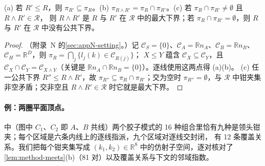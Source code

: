 \begin{lemma}[逐线交与钳夹集的交]\label{lem:method-meets}
(a) 若 $R'\le R$，则 $\pi_{R'}\subseteq\pi_R$。(b) $\pi_{R\wedge R'}=\pi_R\cap\pi_{R'}$。(c) 若 $\pi_R\cap\pi_{R'}\neq\emptyset$ 且 $R\wedge R'\in\mathcal R$，
则 $R\wedge R'$ 是 $R$ 与 $R'$ 在 $\mathcal R$ 中的最大下界；若 $\pi_R\cap\pi_{R'}=\emptyset$，则 $R$ 与 $R'$ 在 $\mathcal R$ 中没有公共下界。
\end{lemma}

\begin{proof}
（附录~N 的\cref{sec:appN-setting}。）记 $\mathcal C_S=\{0\}$、$\mathcal C_A=\mathbb Rn_A$、$\mathcal C_B=\mathbb Rn_B$、$\mathcal C_H=\mathbb R^D$，则 $\pi_R=\bigcap_j\{l_j(k)\in\mathcal C_{R(j)}\}$；
$X\le Y$ 蕴含 $\mathcal C_X\subseteq\mathcal C_Y$，且 $\mathcal C_X\cap\mathcal C_Y=\mathcal C_{X\wedge Y}$（关键是 $\mathbb Rn_A\cap\mathbb Rn_B=\{0\}$）。逐线使用这两点得 (a)(b)。
(c) 任一公共下界 $R''\le R\wedge R'$，故 $\pi_{R''}\subseteq\pi_R\cap\pi_{R'}$；交为空时 $\pi_{R''}=\emptyset$，与 $\mathcal R$ 中钳夹集非空矛盾；交非空且 $R\wedge R'\in\mathcal R$ 时它就是最大下界。
\end{proof}

\paragraph{例：两圈平面顶点。}中（图中 $C_1$、$C_2$ 即 $A$、$B$ 共线）两个胶子模式的 16 种组合里恰有九种是领头钳夹；每个区域是六条内线上的逐线指派，九个区域对逐线交封闭，
有 12 条覆盖关系。我们把每个钳夹集写成 $(k_1,k_2)\in\mathbb R^8$ 中的仿射子空间，逐对核对了\cref{lem:method-meets}(b)（81 对）以及覆盖关系与下文的邻域指数。%

